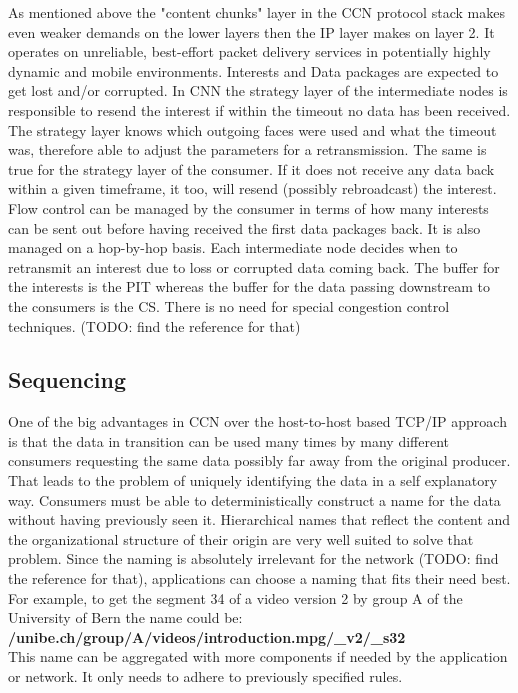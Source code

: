 As mentioned above the "content chunks" layer in the CCN protocol stack makes even weaker demands on the lower layers then the IP layer makes on layer 2. It operates on unreliable, best-effort packet delivery services in potentially highly dynamic and mobile environments. Interests and Data packages are expected to get lost and/or corrupted. In CNN the strategy layer of the intermediate nodes is responsible to resend the interest if within the timeout no data has been received. The strategy layer knows which outgoing faces were used and what the timeout was, therefore able to adjust the parameters for a retransmission. The same is true for the strategy layer of the consumer. If it does not receive any data back within a given timeframe, it too, will resend (possibly rebroadcast) the interest.
Flow control can be managed by the consumer in terms of how many interests can be sent out before having received the first data packages back. It is also managed on a hop-by-hop basis. Each intermediate node decides when to retransmit an interest due to loss or corrupted data coming back. The buffer for the interests is the PIT whereas the buffer for the data passing downstream to the consumers is the CS. There is no need for special congestion control techniques. (TODO: find the reference for that)

\subsection{Sequencing}

One of the big advantages in CCN over the host-to-host based TCP/IP approach is that the data in transition can be used many times by many different consumers requesting the same data possibly far away from the original producer. That leads to the problem of uniquely identifying the data in a self explanatory way. Consumers must be able to deterministically construct a name for the data without having previously seen it. Hierarchical names that reflect the content and the organizational structure of their origin are very well suited to solve that problem. Since the naming is absolutely irrelevant for the network (TODO: find the reference for that), applications can choose a naming that fits their need best. For example, to get the segment 34 of a video version 2 by group A of the University of Bern the name could be: \textbf{/unibe.ch/group/A/videos/introduction.mpg/\_v2/\_s32}\\
This name can be aggregated with more components if needed by the application or network. It only needs to adhere to previously specified rules.


